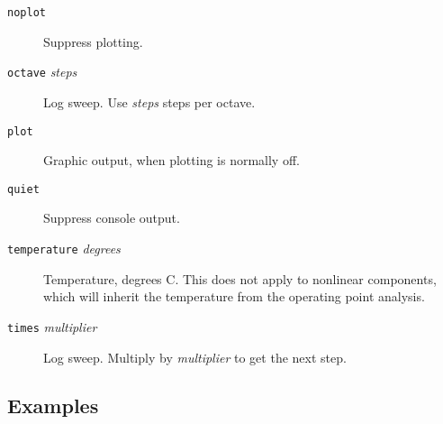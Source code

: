 \begin{description}




\item[{\tt noplot}] Suppress plotting.

\item[{\tt octave} {\it steps}] Log sweep.  Use {\it
steps} steps per octave.

\item[{\tt plot}] Graphic output, when plotting is
normally off.

\item[{\tt quiet}] Suppress console output.



\item[{\tt temperature} {\it degrees}] Temperature,
degrees C.  This does not apply to nonlinear components, which will
inherit the temperature from the operating point analysis.

\item[{\tt times} {\it multiplier}] Log sweep.  Multiply
by {\it multiplier} to get the next step.


\end{description}
\subsection{Examples}

